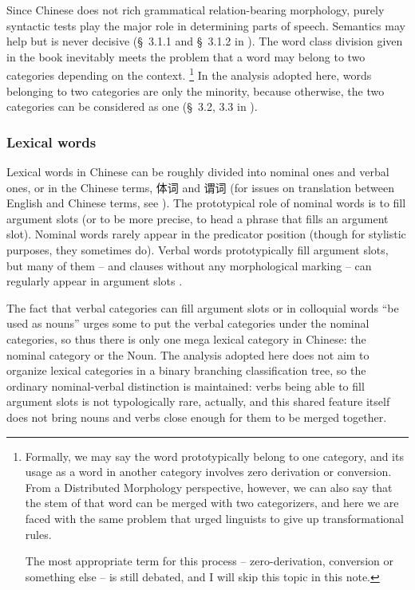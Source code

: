 \documentclass[UTF8, a4paper, oneside, scheme=plain]{ctexart}
\newcommand*{\citesec}[1]{\S~{#1}}
\begin{document}
Since Chinese does not rich grammatical relation-bearing morphology,
purely syntactic tests play the major role in determining parts of speech.
Semantics may help but is never decisive 
(\citesec{3.1.1} and \citesec{3.1.2} in \citet{zhudexigrammar}).
The word class division given in the book inevitably meets the problem 
that a word may belong to two categories depending on the context.%
\footnote{
    Formally, we may say the word prototypically belong to one category,
    and its usage as a word in another category
    involves zero derivation or conversion.
    From a Distributed Morphology perspective,
    however, we can also say that the stem of that word can be merged with 
    two categorizers, 
    and here we are faced with the same problem that 
    urged linguists to give up transformational rules.

    The most appropriate term for this process -- 
    zero-derivation, conversion or something else -- is still debated,
    and I will skip this topic in this note.
}
In the analysis adopted here, words belonging to two categories are only the minority,
because otherwise, the two categories can be considered as one 
(\citesec{3.2, 3.3} in \citet{zhudexigrammar}).

\subsubsection{Lexical words}

Lexical words in Chinese can be roughly divided into nominal ones and verbal ones,
or in the Chinese terms, 体词 and 谓词
(for issues on translation between English and Chinese terms, see ).
The prototypical role of nominal words 
is to fill argument slots (or to be more precise, to head a phrase that fills an argument slot).
Nominal words rarely appear in the predicator position
(though for stylistic purposes, they sometimes do).
Verbal words prototypically fill argument slots,
but many of them -- and clauses without any morphological marking -- 
can regularly appear in argument slots \citep[\citesec{3.5}]{zhudexigrammar}.

The fact that verbal categories can fill argument slots or in colloquial words ``be used as nouns''
urges some to put the verbal categories under the nominal categories,
so thus there is only one mega lexical category in Chinese:
the nominal category or the Noun.
The analysis adopted here does not aim to organize lexical categories 
in a binary branching classification tree,
so the ordinary nominal-verbal distinction is maintained:
verbs being able to fill argument slots is not typologically rare, actually,
and this shared feature itself does not bring nouns and verbs close enough 
for them to be merged together.
\end{document}
